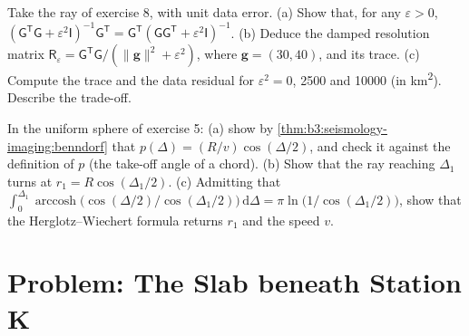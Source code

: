 \begin{exercise}[$\star\star\star$]\label{exo:b3:seismology-imaging:11}
Take the ray of exercise 8, with unit data error. (a) Show that, for any
$\varepsilon > 0$, $(\mathsf G^{\mathsf T}\mathsf G + \varepsilon^2\mathsf
I)^{-1}\mathsf G^{\mathsf T} = \mathsf G^{\mathsf T}(\mathsf G\mathsf
G^{\mathsf T} + \varepsilon^2\mathsf I)^{-1}$. (b) Deduce the damped resolution
matrix $\mathsf R_\varepsilon = \mathsf G^{\mathsf T}\mathsf G/(\|\mathbf g\|^2 +
\varepsilon^2)$, where $\mathbf g = (30, 40)$, and its trace. (c) Compute the
trace and the data residual for $\varepsilon^2 = 0$, 2500 and \num{10000}
(in \unit{km^2}). Describe the trade-off.
\end{exercise}

\begin{exercise}[$\star\star\star$]\label{exo:b3:seismology-imaging:12}
In the uniform sphere of exercise 5: (a) show by
\cref{thm:b3:seismology-imaging:benndorf} that $p(\Delta) = (R/v)\cos(\Delta/2)$,
and check it against the definition of $p$ (the take-off angle of a chord).
(b) Show that the ray reaching $\Delta_1$ turns at $r_1 = R\cos(\Delta_1/2)$.
(c) Admitting that $\int_0^{\Delta_1}\operatorname{arccosh}\bigl(\cos(\Delta/2)
/\cos(\Delta_1/2)\bigr)\,\mathrm d\Delta = \pi\ln\bigl(1/\cos(\Delta_1/2)\bigr)$,
show that the Herglotz--Wiechert formula returns $r_1$ and the speed $v$.
\end{exercise}

\section{Problem: The Slab beneath Station K}


